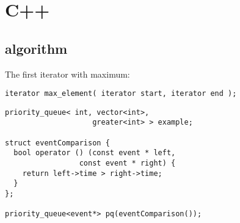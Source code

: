 \section{C++}


\subsection{algorithm}

The first iterator with maximum:

\verb!iterator max_element( iterator start, iterator end );!




\begin{verbatim}
priority_queue< int, vector<int>,
                    greater<int> > example;

struct eventComparison {
  bool operator () (const event * left,
	             const event * right) {
    return left->time > right->time;
  }
};

priority_queue<event*> pq(eventComparison());
\end{verbatim}


